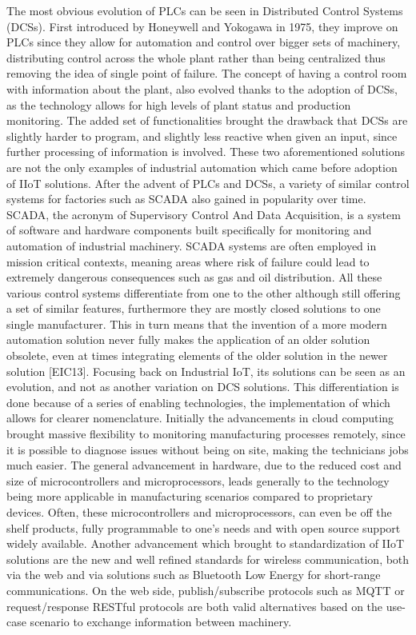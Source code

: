 \documentclass[a4paper, 12pt]{book}
\begin{document}
The most obvious evolution of PLCs can be seen in Distributed Control Systems (DCSs). First introduced by Honeywell and Yokogawa in 1975, they improve on PLCs since they allow for automation and control over bigger sets of machinery, distributing control across the whole plant rather than being centralized thus removing the idea of single point of failure. The concept of having a control room with information about the plant, also evolved thanks to the adoption of DCSs, as the technology allows for high levels of plant status and production monitoring. The added set of functionalities brought the drawback that DCSs are slightly harder to program, and slightly less reactive when given an input, since further processing of information is involved. These two aforementioned solutions are not the only examples of industrial automation which came before adoption of IIoT solutions. After the advent of PLCs and DCSs, a variety of similar control systems for factories such as SCADA also gained in popularity over time. SCADA, the acronym of Supervisory Control And Data Acquisition, is a system of software and hardware components built specifically for monitoring and automation of industrial machinery. SCADA systems are often employed in mission critical contexts, meaning areas where risk of failure could lead to extremely dangerous consequences such as gas and oil distribution. All these various control systems differentiate from one to the other although still offering a set of similar features, furthermore they are mostly closed solutions to one single manufacturer. This in turn means that the invention of a more modern automation solution never fully makes the application of an older solution obsolete, even at times integrating elements of the older solution in the newer solution [EIC13].
Focusing back on Industrial IoT, its solutions can be seen as an evolution, and not as another variation on DCS solutions. This differentiation is done because of a series of enabling technologies, the implementation of which allows for clearer nomenclature. Initially the advancements in cloud computing brought massive flexibility to monitoring manufacturing processes remotely, since it is possible to diagnose issues without being on site, making the technicians jobs much easier. The general advancement in hardware, due to the reduced cost and size of microcontrollers and microprocessors, leads generally to the technology being more applicable in manufacturing scenarios compared to proprietary devices. Often, these microcontrollers and microprocessors, can even be off the shelf products, fully programmable to one’s needs and with open source support widely available. Another advancement which brought to standardization of IIoT solutions are the new and well refined standards for wireless communication, both via the web and via solutions such as Bluetooth Low Energy for short-range communications. On the web side, publish/subscribe protocols such as MQTT or request/response RESTful protocols are both valid alternatives based on the use-case scenario to exchange information between machinery.
\end{document}
